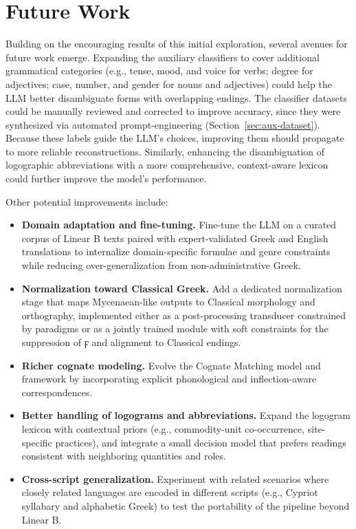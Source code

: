\section{Future Work}

Building on the encouraging results of this initial exploration, several avenues for future work emerge.
Expanding the auxiliary classifiers to cover additional grammatical categories (e.g., tense, mood, and voice for verbs; degree for adjectives; case, number, and gender for nouns and adjectives) could help the LLM better disambiguate forms with overlapping endings.
The classifier datasets could be manually reviewed and corrected to improve accuracy, since they were synthesized via automated prompt-engineering (Section~\ref{sec:aux-dataset}).
Because these labels guide the LLM's choices, improving them should propagate to more reliable reconstructions.
Similarly, enhancing the disambiguation of logographic abbreviations with a more comprehensive, context-aware lexicon could further improve the model's performance.

Other potential improvements include:
\begin{itemize}
\item \textbf{Domain adaptation and fine-tuning.} Fine-tune the LLM on a curated corpus of Linear B texts paired with expert-validated Greek and English translations to internalize domain-specific formulae and genre constraints while reducing over-generalization from non-administrative Greek.

\item \textbf{Normalization toward Classical Greek.} Add a dedicated normalization stage that maps Mycenaean-like outputs to Classical morphology and orthography, implemented either as a post-processing transducer constrained by paradigms or as a jointly trained module with soft constraints for the suppression of \textgreek{ϝ} and alignment to Classical endings.  

\item \textbf{Richer cognate modeling.} Evolve the Cognate Matching model and framework by incorporating explicit phonological and inflection-aware correspondences.

\item \textbf{Better handling of logograms and abbreviations.} Expand the logogram lexicon with contextual priors (e.g., commodity-unit co-occurrence, site-specific practices), and integrate a small decision model that prefers readings consistent with neighboring quantities and roles.  

\item \textbf{Cross-script generalization.} Experiment with related scenarios where closely related languages are encoded in different scripts (e.g., Cypriot syllabary and alphabetic Greek) to test the portability of the pipeline beyond Linear B.  
\end{itemize}

